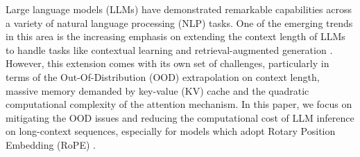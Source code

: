 Large language models (LLMs) have demonstrated remarkable capabilities across a variety of natural language processing (NLP) tasks.
One of the emerging trends in this area is the increasing emphasis on extending the context length of LLMs to handle tasks like contextual learning and retrieval-augmented generation \citep{dong2022survey,gao2023retrieval}. However, this extension comes with its own set of challenges, particularly in terms of the Out-Of-Distribution (OOD) extrapolation on context length, massive memory demanded by key-value (KV) cache and the quadratic computational complexity of the attention mechanism. In this paper, we focus on mitigating the OOD issues and reducing the computational cost of LLM inference on long-context sequences, especially for models which adopt Rotary Position Embedding (RoPE) \citep{su2024roformer}.


